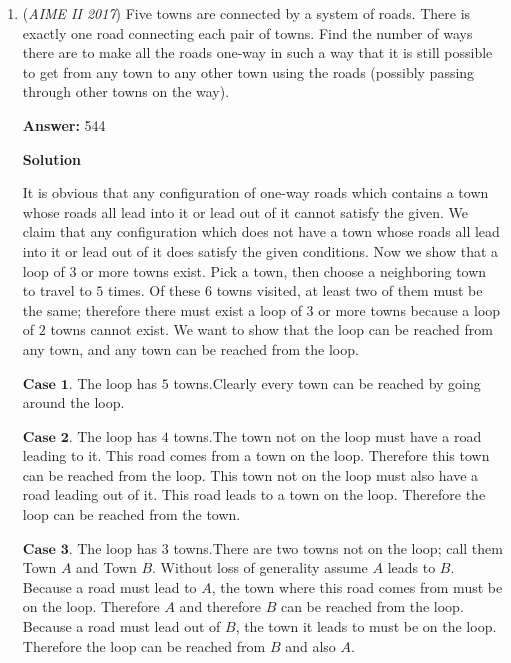 \begin{enumerate}
 - The\_Other\_Guy

 


	\item (\textit{AIME II 2017}) Five towns are connected by a system of roads. There is exactly one road connecting each pair of towns. Find the number of ways there are to make all the roads one-way in such a way that it is still possible to get from any town to any other town using the roads (possibly passing through other towns on the way).


 
 \textbf{Answer: }544



\textbf{Solution}

It is obvious that any configuration of one-way roads which contains a town whose roads all lead into it or lead out of it cannot satisfy the given. We claim that any configuration which does not have a town whose roads all lead into it or lead out of it does satisfy the given conditions. Now we show that a loop of $3$ or more towns exist. Pick a town, then choose a neighboring town to travel to $5$ times. Of these $6$ towns visited, at least two of them must be the same; therefore there must exist a loop of $3$ or more towns because a loop of $2$ towns cannot exist. We want to show that the loop can be reached from any town, and any town can be reached from the loop.

 $\textbf{Case 1}$. The loop has $5$ towns.Clearly every town can be reached by going around the loop.

 $\textbf{Case 2}$. The loop has $4$ towns.The town not on the loop must have a road leading to it. This road comes from a town on the loop. Therefore this town can be reached from the loop. This town not on the loop must also have a road leading out of it. This road leads to a town on the loop. Therefore the loop can be reached from the town.

 $\textbf{Case 3}$. The loop has $3$ towns.There are two towns not on the loop; call them Town $A$ and Town $B$. Without loss of generality assume $A$ leads to $B$. Because a road must lead to $A$, the town where this road comes from must be on the loop. Therefore $A$ and therefore $B$ can be reached from the loop. Because a road must lead out of $B$, the town it leads to must be on the loop. Therefore the loop can be reached from $B$ and also $A$.


\end{enumerate}
